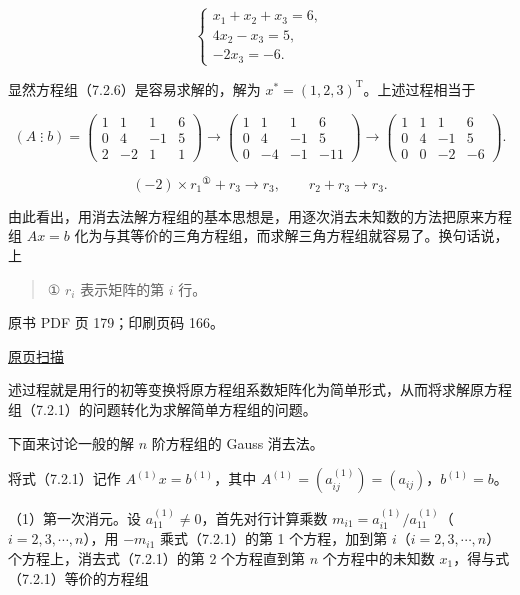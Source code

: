 \[
\begin{cases}
x_1+x_2+x_3=6,\\
4x_2-x_3=5,\\
-2x_3=-6.
\end{cases}
\tag{7.2.6}
\]

显然方程组（7.2.6）是容易求解的，解为 \(x^*=(1,2,3)^{\mathrm T}\)。上述过程相当于

\[
(A\mathbin{\vdots}b)=
\left(\begin{array}{rrr|r}1&1&1&6\\0&4&-1&5\\2&-2&1&1\end{array}\right)
\longrightarrow
\left(\begin{array}{rrr|r}1&1&1&6\\0&4&-1&5\\0&-4&-1&-11\end{array}\right)
\longrightarrow
\left(\begin{array}{rrr|r}1&1&1&6\\0&4&-1&5\\0&0&-2&-6\end{array}\right).
\]

\[(-2)\times r_1{}^{\text{①}}+r_3\to r_3,\qquad r_2+r_3\to r_3.\]

由此看出，用消去法解方程组的基本思想是，用逐次消去未知数的方法把原来方程组 \(Ax=b\) 化为与其等价的三角方程组，而求解三角方程组就容易了。换句话说，上

\begin{quote}
① \(r_i\) 表示矩阵的第 \(i\) 行。
\end{quote}

\clearpage

原书 PDF 页 179；印刷页码 166。

\href{source-images/pdf-179.jpeg}{原页扫描}

述过程就是用行的初等变换将原方程组系数矩阵化为简单形式，从而将求解原方程组（7.2.1）的问题转化为求解简单方程组的问题。

下面来讨论一般的解 \(n\) 阶方程组的 Gauss 消去法。

将式（7.2.1）记作 \(A^{(1)}x=b^{(1)}\)，其中 \(A^{(1)}=(a_{ij}^{(1)})=(a_{ij})\)，\(b^{(1)}=b\)。

（1）第一次消元。设 \(a_{11}^{(1)}\ne0\)，首先对行计算乘数 \(m_{i1}=a_{i1}^{(1)}/a_{11}^{(1)}\)（\(i=2,3,\cdots,n\)），用 \(-m_{i1}\) 乘式（7.2.1）的第 1 个方程，加到第 \(i\)（\(i=2,3,\cdots,n\)）个方程上，消去式（7.2.1）的第 2 个方程直到第 \(n\) 个方程中的未知数 \(x_1\)，得与式（7.2.1）等价的方程组


